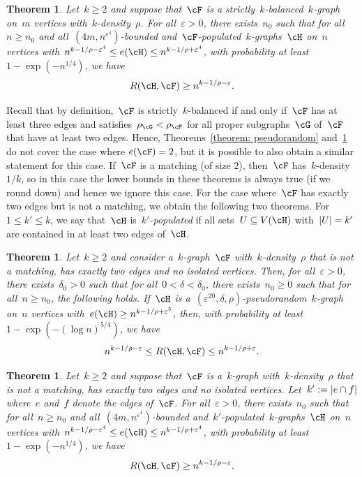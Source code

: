 \documentclass[11pt]{amsart}
\newcommand{\eps}{\varepsilon}
\DeclarePairedDelimiter{\abs}{\lvert}{\rvert}
\newtheorem{theorem}[algocf]{Theorem}
\theoremstyle{definition}
\numberwithin{equation}{section}
\begin{document}
	
	\begin{theorem}\label{theorem: sparse}
		Let~$k\geq 2$ and suppose that~$\cF$ is a strictly~$k$-balanced~$k$-graph on~$m$ vertices with~$k$-density~$\rho$.
		For all~$\eps>0$, there exists~$n_0$ such that for all~$n\geq n_0$ and all~$(4m,n^{\eps^4})$-bounded and~$\cF$-populated~$k$-graphs~$\cH$ on~$n$ vertices with~$n^{k-1/\rho-\eps^4}\leq e(\cH)\leq n^{k-1/\rho+\eps^4}$, with probability at least~$1-\exp(-n^{1/4})$, we have
		\begin{equation*}
			R(\cH,\cF)\geq n^{k-1/\rho-\eps}.
		\end{equation*}
	\end{theorem}
	
	
	Recall that by definition,~$\cF$ is strictly~$k$-balanced if and only if~$\cF$ has at least three edges and satisfies~$\rho_{\cG}<\rho_\cF$ for all proper subgraphs~$\cG$ of~$\cF$ that have at least two edges. 
	Hence, Theorems~\ref{theorem: pseudorandom} and~\ref{theorem: sparse} do not cover the case where $e(\cF)=2$,
	but it is possible to also obtain a similar statement for this case.
	If~$\cF$ is a matching (of size $2$), then~$\cF$ has~$k$-density~$1/k$, so in this case the lower bounds in these theorems is always true (if we round down) and hence we ignore this case.
	For the case where~$\cF$ has exactly two edges but is not a matching, we obtain the following two theorems.
	For~$1\leq k'\leq k$, we say that~$\cH$ is~\emph{$k'$-populated} if all sets~$U\subseteq V(\cH)$ with~$\abs{U}=k'$ are contained in at least two edges of~$\cH$.
	
	\begin{theorem}\label{theorem: cherries}
		Let~$k\geq 2$ and consider a~$k$-graph~$\cF$ with~$k$-density~$\rho$ that is not a matching, has exactly two edges and no isolated vertices.
		Then, for all~$\eps>0$, there exists~$\delta_0>0$ such that for all~$0<\delta<\delta_0$, there exists~$n_0\geq 0$ such that for all~$n\geq n_0$, the following holds.
		If~$\cH$ is a~$(\eps^{20},\delta,\rho)$-pseudorandom~$k$-graph on~$n$ vertices with~$e(\cH)\geq n^{k-1/\rho+\eps^5}$, then, with probability at least~$1-\exp(-(\log n)^{5/4})$, we have
		\begin{equation*}
			n^{k-1/\rho-\eps}\leq R(\cH,\cF)\leq n^{k-1/\rho+\eps}.
		\end{equation*}
	\end{theorem}
	
	\begin{theorem}\label{theorem: sparse cherries}
		Let~$k\geq 2$ and suppose that~$\cF$ is a~$k$-graph with~$k$-density~$\rho$ that is not a matching, has exactly two edges and no isolated vertices.
		Let~$k':=\abs{e\cap f}$ where~$e$ and~$f$ denote the edges of~$\cF$.
		For all~$\eps>0$, there exists~$n_0$ such that for all~$n\geq n_0$ and all~$(4m,n^{\eps^4})$-bounded and~$k'$-populated~$k$-graphs~$\cH$ on~$n$ vertices with~$n^{k-1/\rho-\eps^4}\leq e(\cH)\leq n^{k-1/\rho+\eps^4}$, with probability at least~$1-\exp(-n^{1/4})$, we have
		\begin{equation*}
			R(\cH,\cF)\geq n^{k-1/\rho-\eps}.
		\end{equation*}
	\end{theorem}
\end{document}
